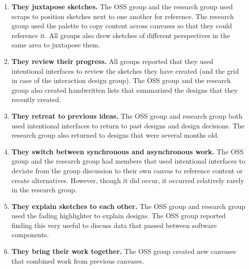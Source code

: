 \begin{enumerate}
	\item \textbf{They juxtapose sketches.} The OSS group and the research group used scraps to position sketches next to one another for reference. The research group used the palette to copy content across canvases so that they could reference it. All groups also drew sketches of different perspectives in the same area to juxtapose them.
	\item \textbf{They review their progress.} All groups reported that they used intentional interfaces to review the sketches they have created (and the grid in case of the interaction design group). The OSS group and the research group also created handwritten lists that summarized the designs that they recently created.
	\item \textbf{They retreat to previous ideas.} The OSS group and research group both used intentional interfaces to return to past designs and design decisions. The research group also returned to designs that were several months old.
	\item \textbf{They switch between synchronous and asynchronous work.} The OSS group and the research group had members that used intentional interfaces to deviate from the group discussion to their own canvas to reference content or create alternatives. However, though it did occur, it occurred relatively rarely in the research group. 
	\item \textbf{They explain sketches to each other.} The OSS group and research group used the fading highlighter to explain designs. The OSS group reported finding this very useful to discuss data that passed between software components. 
	\item \textbf{They bring their work together.} The OSS group created new canvases that combined work from previous canvases.
\end{enumerate}

